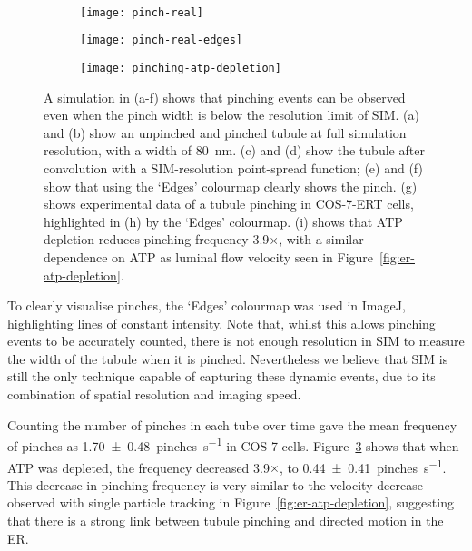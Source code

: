 \begin{figure}[tbp]
~\newline
\begin{subfigure}[b]{0.36\textwidth}
	\texttt{[image: pinch-real]}
	\caption{}\label{fig:pinched-real}
\end{subfigure}\hfill
\begin{subfigure}[b]{0.36\textwidth}
	\texttt{[image: pinch-real-edges]}
	\caption{}\label{fig:pre-real-edges}
\end{subfigure}\hfill
\begin{subfigure}[b]{0.265\textwidth}
	\texttt{[image: pinching-atp-depletion]}
	\caption{}\label{fig:pinching-atp-depletion}
\end{subfigure}
\caption[ER: Tubule pinching can be observed with the `Edges' colourmap]{A simulation in (a-f) shows that pinching events can be observed even when the pinch width is below the resolution limit of SIM. (a) and (b) show an unpinched and pinched tubule at full simulation resolution, with a width of \SI{80}{\nano\metre}. (c) and (d) show the tubule after convolution with a SIM-resolution point-spread function; (e) and (f) show that using the `Edges' colourmap clearly shows the pinch.  (g) shows experimental data of a tubule pinching in COS-7-ERT cells, highlighted in (h) by the `Edges' colourmap. (i) shows that ATP depletion reduces pinching frequency 3.9$\times$, with a similar dependence on ATP as luminal flow velocity seen in Figure~\ref{fig:er-atp-depletion}. }
\label{fig:er-pinching}
\end{figure}

To clearly visualise pinches, the `Edges' colourmap was used in ImageJ, highlighting lines of constant intensity.
Note that, whilst this allows pinching events to be accurately counted, there is not enough resolution in SIM to measure the width of the tubule when it is pinched.
Nevertheless we believe that SIM is still the only technique capable of capturing these dynamic events, due to its combination of spatial resolution and imaging speed.

Counting the number of pinches in each tube over time gave the mean frequency of pinches as \SI[separate-uncertainty=true]{1.70 \pm 0.48}{pinches\per\second} in COS-7 cells.
Figure~\ref{fig:pinching-atp-depletion} shows that when ATP was depleted, the frequency decreased 3.9$\times$, to \SI[separate-uncertainty=true]{0.44 \pm 0.41}{pinches\per\second}.
This decrease in pinching frequency is very similar to the velocity decrease observed with single particle tracking in Figure~\ref{fig:er-atp-depletion}, suggesting that there is a strong link between tubule pinching and directed motion in the ER.

